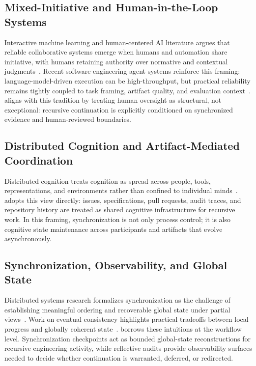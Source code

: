 \subsection{Mixed-Initiative and Human-in-the-Loop Systems}

Interactive machine learning and human-centered AI literature argues that reliable collaborative systems emerge when humans and automation share initiative, with humans retaining authority over normative and contextual judgments~\cite{Amershi2014InteractiveML,Shneiderman2020HCAI}. Recent software-engineering agent systems reinforce this framing: language-model-driven execution can be high-throughput, but practical reliability remains tightly coupled to task framing, artifact quality, and evaluation context~\cite{Chen2021Codex,Jimenez2024SWEBench,Yang2024SWEAgent}.  aligns with this tradition by treating human oversight as structural, not exceptional: recursive continuation is explicitly conditioned on synchronized evidence and human-reviewed boundaries.

\subsection{Distributed Cognition and Artifact-Mediated Coordination}

Distributed cognition treats cognition as spread across people, tools, representations, and environments rather than confined to individual minds~\cite{Hutchins1995CognitionWild}.  adopts this view directly: issues, specifications, pull requests, audit traces, and repository history are treated as shared cognitive infrastructure for recursive work. In this framing, synchronization is not only process control; it is also cognitive state maintenance across participants and artifacts that evolve asynchronously.

\subsection{Synchronization, Observability, and Global State}

Distributed systems research formalizes synchronization as the challenge of establishing meaningful ordering and recoverable global state under partial views~\cite{Lamport1978TimeClocks,Chandy1985DistributedSnapshots}. Work on eventual consistency highlights practical tradeoffs between local progress and globally coherent state~\cite{Vogels2009EventuallyConsistent}.  borrows these intuitions at the workflow level. Synchronization checkpoints act as bounded global-state reconstructions for recursive engineering activity, while reflective audits provide observability surfaces needed to decide whether continuation is warranted, deferred, or redirected.

